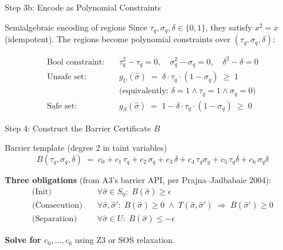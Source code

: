 \documentclass[aspectratio=169]{beamer}
\begin{document}
\begin{frame}{Step 3b: Encode as Polynomial Constraints}
\begin{block}{Semialgebraic encoding of regions}
Since $\tau_q, \sigma_q, \delta \in \{0,1\}$, they satisfy $x^2 = x$ (idempotent).
The regions become polynomial constraints over $(\tau_q, \sigma_q, \delta)$:
\end{block}

\vspace{0.3em}
\begin{align}
  \text{Bool constraint:}\quad & \tau_q^2 - \tau_q = 0,\quad \sigma_q^2 - \sigma_q = 0,\quad \delta^2 - \delta = 0 \label{eq:bool}\\[6pt]
  \text{Unsafe set:}\quad & g_U(\hat\sigma) \;=\; \delta \cdot \tau_q \cdot (1 - \sigma_q) \;\ge\; 1 \label{eq:unsafe}\\[4pt]
  & \text{(equivalently: } \delta = 1 \wedge \tau_q = 1 \wedge \sigma_q = 0\text{)} \nonumber\\[6pt]
  \text{Safe set:}\quad & g_S(\hat\sigma) \;=\; 1 - \delta \cdot \tau_q \cdot (1 - \sigma_q) \;\ge\; 0 \label{eq:safe}
\end{align}

\vspace{0.5em}
\begin{center}
\end{center}
\end{frame}


\begin{frame}{Step 4: Construct the Barrier Certificate $B$}
\begin{block}{Barrier template (degree 2 in taint variables)}
\vspace{-0.3em}
\[
  B(\tau_q, \sigma_q, \delta) \;=\; c_0 + c_1\,\tau_q + c_2\,\sigma_q + c_3\,\delta + c_4\,\tau_q\sigma_q + c_5\,\tau_q\delta + c_6\,\sigma_q\delta
\]
\end{block}

\vspace{0.3em}
\textbf{Three obligations} (from A3's barrier API, per Prajna--Jadbabaie 2004):
\begin{align}
  \text{(Init)}\quad & \forall \hat\sigma \in S_0:\; B(\hat\sigma) \ge \epsilon \label{eq:init}\\[4pt]
  \text{(Consecution)}\quad & \forall \hat\sigma,\hat\sigma':\;
    B(\hat\sigma) \ge 0 \;\wedge\; T(\hat\sigma,\hat\sigma')
    \;\Rightarrow\; B(\hat\sigma') \ge 0 \label{eq:consec}\\[4pt]
  \text{(Separation)}\quad & \forall \hat\sigma \in U:\; B(\hat\sigma) \le -\epsilon \label{eq:sep}
\end{align}

\vspace{0.5em}
\textbf{Solve for $c_0, \ldots, c_6$} using Z3 or SOS relaxation.
\end{frame}
\end{document}
